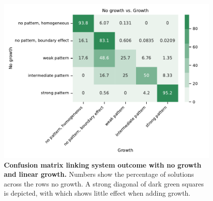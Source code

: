 \begin{figure}[H] %
    \centering
    \begin{adjustbox}{center}
        \includegraphics[width=1\textwidth]{chapters/Chapter 1/openboundary_edgegrowth2_confusion_variant0-11-12} %
    \end{adjustbox}
    \caption{\textbf{Confusion matrix linking system outcome with no growth and linear growth.} Numbers show the percentage of solutions across the rows no growth. A strong diagonal of dark green squares is depicted, with which shows little effect when adding growth.}
    \label{fig:openboundary_edgegrowth2_confusion_variant0} %
\end{figure}


